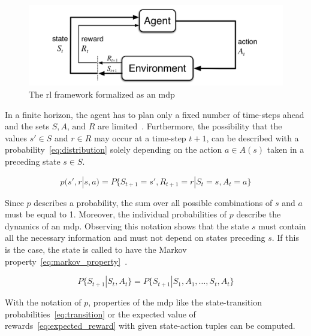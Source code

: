 \documentclass[draft,final]{vutinfth} %
\newcommand{\p}[1]{see p. #1}
\begin{document}
    \begin{figure}[h]
        \centering
        \includegraphics[width=\textwidth]{figures/rl_problem.png}
        \caption[The \gls{rl} framework formalized as an \gls{mdp}]{The \gls{rl} framework formalized as an \gls{mdp}\protect\footnotemark}
        \label{fig:rl_problem}
    \end{figure}

    \footnotetext{\cite[\p{48}]{sutton_reinforcement_2018}}

    In a finite horizon, the agent has to plan only a fixed number of time-steps ahead and the sets $\mathit{S},\mathit{A}\text{, and }\mathit{R}$ are limited~\citep[\p{47f}]{sutton_reinforcement_2018,kaelbling_reinforcement_1996}.
    Furthermore, the possibility that the values $s'\in \mathit{S}$ and $r \in \mathit{R}$ may occur at a time-step $t+1$, can be described with a probability~\eqref{eq:distribution} solely depending on the action $a \in \mathit{A}(s)$ taken in a preceding state $s \in \mathit{S}$.

    \begin{equation}
        p(s',r|s,a) = P\{S_{t+1}=s', R_{t+1}=r | S_t=s, A_t=a\}\label{eq:distribution}
    \end{equation}

    Since $p$ describes a probability, the sum over all possible combinations of $s$ and $a$ must be equal to 1.
    Moreover, the individual probabilities of $p$ describe the dynamics of an \gls{mdp}.
    Observing this notation shows that the state $s$ must contain all the necessary information and must not depend on states preceding $s$.
    If this is the case, the state is called to have the Markov property~\eqref{eq:markov_property}~\citep{francois-lavet_introduction_2018}.

    \begin{equation}
        P\{S_{t+1}|S_t,A_t\} = P\{S_{t+1}|S_1,A_1,\ldots,S_t,A_t\} \label{eq:markov_property}
    \end{equation}

    With the notation of $p$, properties of the \gls{mdp} like the state-transition probabilities~\eqref{eq:transition} or the expected value of rewards~\eqref{eq:expected_reward} with given state-action tuples can be computed.
\end{document}
